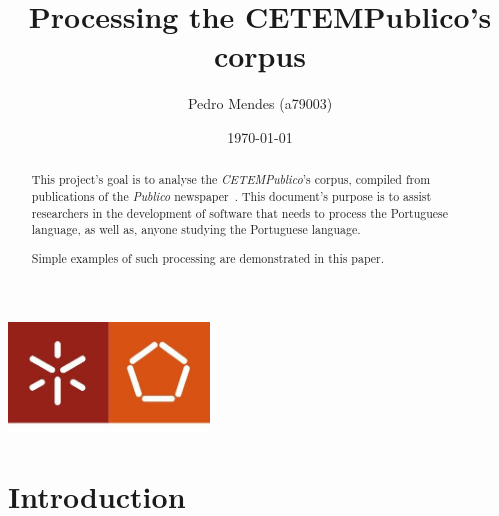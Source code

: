 \documentclass[a4paper]{report}
\begin{document}
\title{Processing the CETEMPublico's corpus}
\author{Pedro Mendes (a79003)}
\date{\today}

\begin{center}
    \begin{minipage}{0.75\linewidth}
        \centering
        \includegraphics[width=0.4\textwidth]{eng.jpeg}\par\vspace{1cm}
        \vspace{1.5cm}
        \href{https://www.uminho.pt/PT}
        {\color{black}{\scshape\LARGE Universidade do Minho}} \par
        \vspace{1cm}
        \href{https://www.di.uminho.pt/}
        {\color{black}{\scshape\Large Departamento de Informática}} \par
        \vspace{1.5cm}
        \maketitle
    \end{minipage}
\end{center}

\begin{abstract}
    \begin{center}
        This project's goal is to analyse the \textit{CETEMPublico}'s corpus,
        compiled from publications of the \textit{Publico}
        newspaper~\cite{CETEMPublico}. This document's purpose is to assist
        researchers in the development of software that needs to process the
        Portuguese language, as well as, anyone studying the Portuguese
        language.

        Simple examples of such processing are demonstrated in this paper.
    \end{center}
\end{abstract}

\tableofcontents

\pagebreak

\chapter{Introduction}
\end{document}
